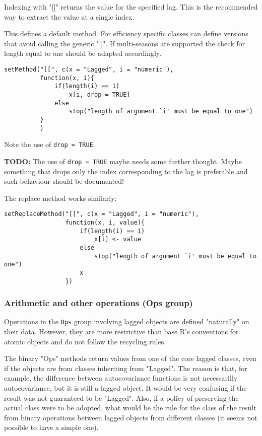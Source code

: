 \documentclass[11pt,a4paper]{article}
\begin{document}
Indexing with "[[" returns the value for the specified lag. This is the recommended way to
extract the value at a single index.

This defines a default method. For efficiency specific classes can define versions that avoid
calling the generic "[[". If multi-seasons are supported the check for length equal to one
should be adapted accordingly.
\begin{verbatim}
setMethod("[[", c(x = "Lagged", i = "numeric"),
          function(x, i){
              if(length(i) == 1)
                  x[i, drop = TRUE]
              else
                  stop("length of argument `i' must be equal to one")
          }
          )
\end{verbatim}
Note the use of \texttt{drop = TRUE}.

\textbf{TODO:} The use of \texttt{drop = TRUE} maybe needs some further thought. Maybe something that drops
only the index corresponding to the lag is preferable and such behaviour should be documented!

The replace method works similarly:
\begin{verbatim}
setReplaceMethod("[[", c(x = "Lagged", i = "numeric"),
                 function(x, i, value){
                     if(length(i) == 1)
                         x[i] <- value
                     else
                         stop("length of argument `i' must be equal to one")
                     x
                 })
\end{verbatim}



\subsubsection{Arithmetic and other operations (Ops group)}
\label{sec:org8bd6503}

Operations in the \texttt{Ops} group involving lagged objects are defined "naturally" on their
data. However, they are more restrictive than base R's conventions for atomic objects and do
not follow the recycling rules.

The binary "Ops" methods return values from one of the core lagged classes, even if the
objects are from classes inheriting from "Lagged". The reason is that, for example, the
difference between autocovariance functions is not necessarilly autocovariance, but it is
still a lagged object. It would be very confusing if the result was not guaranteed to be
"Lagged".  Also, if a policy of preserving the actual class were to be adopted, what would
be the rule for the class of the result from binary operations between lagged objects from
different classes (it seems not possible to have a simple one). 
\end{document}
